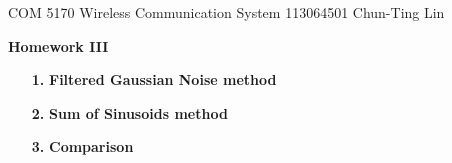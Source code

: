 \documentclass[letterpaper,12pt]{article}
\begin{document}
  \noindent COM 5170 Wireless Communication System \hfill 113064501  Chun-Ting Lin \\

  \begin{center}
    {\bf \large  Homework III}
  \end{center}


  \begin{enumerate}
    \item[{\bf 1. }]  \textbf{Filtered Gaussian Noise method} \hfill \\
      
    \item[{\bf 2. }]  \textbf{Sum of Sinusoids method} \hfill \\
      
    \item[{\bf 3. }]  \textbf{Comparison} \hfill \\
      
  \end{enumerate}
\end{document}
